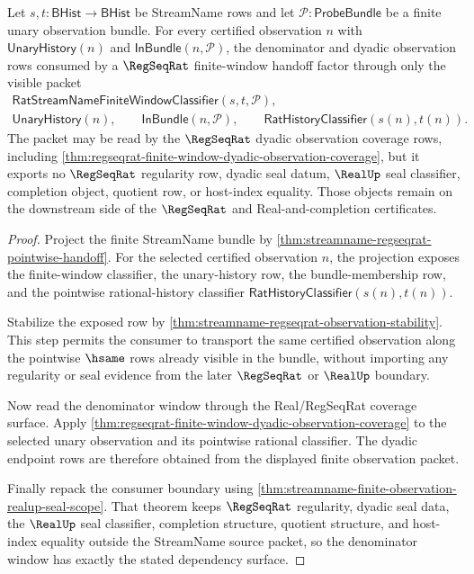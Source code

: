 \begin{theorem}
\label{thm:streamname-regseqrat-denominator-window-separation}
Let $s,t:\mathsf{BHist}\to\mathsf{BHist}$ be StreamName rows and let
$\mathcal P:\mathsf{ProbeBundle}$ be a finite unary observation bundle. For
every certified observation $n$ with $\mathsf{UnaryHistory}(n)$ and
$\mathsf{InBundle}(n,\mathcal P)$, the denominator and dyadic observation rows
consumed by a $\RegSeqRat$ finite-window handoff factor through only the
visible packet
$$
\begin{gathered}
\mathsf{RatStreamNameFiniteWindowClassifier}(s,t,\mathcal P),\\
\mathsf{UnaryHistory}(n),\qquad
\mathsf{InBundle}(n,\mathcal P),\qquad
\mathsf{RatHistoryClassifier}(s(n),t(n)).
\end{gathered}
$$
The packet may be read by the $\RegSeqRat$ dyadic observation coverage rows,
including
\autoref{thm:regseqrat-finite-window-dyadic-observation-coverage}, but it
exports no $\RegSeqRat$ regularity row, dyadic seal datum, $\RealUp$ seal
classifier, completion object, quotient row, or host-index equality. Those
objects remain on the downstream side of the $\RegSeqRat$ and
Real-and-completion certificates.
\end{theorem}
\begin{proof}
Project the finite StreamName bundle by
\autoref{thm:streamname-regseqrat-pointwise-handoff}. For the selected
certified observation $n$, the projection exposes the finite-window
classifier, the unary-history row, the bundle-membership row, and the
pointwise rational-history classifier
$\mathsf{RatHistoryClassifier}(s(n),t(n))$.

Stabilize the exposed row by
\autoref{thm:streamname-regseqrat-observation-stability}. This step permits
the consumer to transport the same certified observation along the pointwise
$\hsame$ rows already visible in the bundle, without importing any regularity
or seal evidence from the later $\RegSeqRat$ or $\RealUp$ boundary.

Now read the denominator window through the Real/RegSeqRat coverage surface.
Apply
\autoref{thm:regseqrat-finite-window-dyadic-observation-coverage} to the
selected unary observation and its pointwise rational classifier. The dyadic
endpoint rows are therefore obtained from the displayed finite observation
packet.

Finally repack the consumer boundary using
\autoref{thm:streamname-finite-observation-realup-seal-scope}. That theorem
keeps $\RegSeqRat$ regularity, dyadic seal data, the $\RealUp$ seal
classifier, completion structure, quotient structure, and host-index equality
outside the StreamName source packet, so the denominator window has exactly
the stated dependency surface.
\end{proof}

